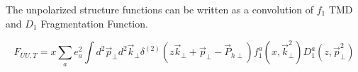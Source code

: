 The unpolarized structure functions can be written as a convolution of $f_1$ TMD and $D_1$ Fragmentation Function.

\begin{equation}
  F_{UU,T} = x \sum_{a} e^{2}_{a} \int d^{2}\vec{p}_{\perp} d^{2}\vec{k}_{\perp} \delta^{(2)} \left( z\vec{k}_{\perp} + \vec{p}_{\perp} - \vec{P}_{h\perp} \right) f_{1}^{a}(x, \vec{k}_{\perp}^{2}) D_{1}^{a}(z, \vec{p}_{\perp}^{2})
\end{equation}


